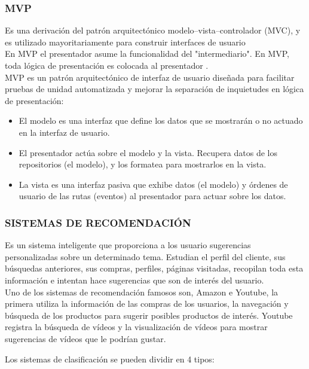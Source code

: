 \subsubsection{\textbf{MVP}}
Es una derivación del patrón arquitectónico modelo–vista–controlador (MVC), y es utilizado mayoritariamente para construir interfaces de usuario\\
En MVP el presentador asume la funcionalidad del "intermediario". En MVP, toda lógica de presentación es colocada al presentador .\\
MVP es un patrón arquitectónico de interfaz de usuario diseñada para facilitar pruebas de unidad automatizada y mejorar la separación de inquietudes en lógica de presentación:
\begin{itemize}
\item El modelo es una interfaz que define los datos que se mostrarán o no actuado en la interfaz de usuario.
\item El presentador actúa sobre el modelo y la vista. Recupera datos de los repositorios (el modelo), y los formatea para mostrarlos en la vista.
\item La vista es una interfaz pasiva que exhibe datos (el modelo) y órdenes de usuario de las rutas (eventos) al presentador para actuar sobre los datos.
\end{itemize}

\subsubsection{\textbf{SISTEMAS DE RECOMENDACIÓN}}

Es un sistema inteligente que proporciona a los usuario sugerencias personalizadas sobre un determinado tema. Estudian el perfil del cliente, sus búsquedas anteriores, sus compras, perfiles, páginas visitadas, recopilan toda esta información e intentan hace sugerencias que son de interés del usuario.\\

Uno de los sistemas de recomendación famosos son, Amazon e Youtube, la primera utiliza la información de las compras de los usuarios, la navegación y búsqueda de los productos para sugerir posibles productos de interés. Youtube registra la búsqueda de vídeos y la visualización de vídeos para mostrar sugerencias de vídeos que le podrían gustar. \cite{Quesonl99:online}

Los sistemas de clasificación se pueden dividir en 4 tipos:  

